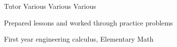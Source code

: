 \begin{cventries}
\cventry
{Tutor} %
{Various} %
{Various} %
{Various} %
{
  \begin{cvitems} %
    \item Prepared lessons and worked through practice problems
    \item First year engineering calculus, Elementary Math
  \end{cvitems}
}







\end{cventries}
